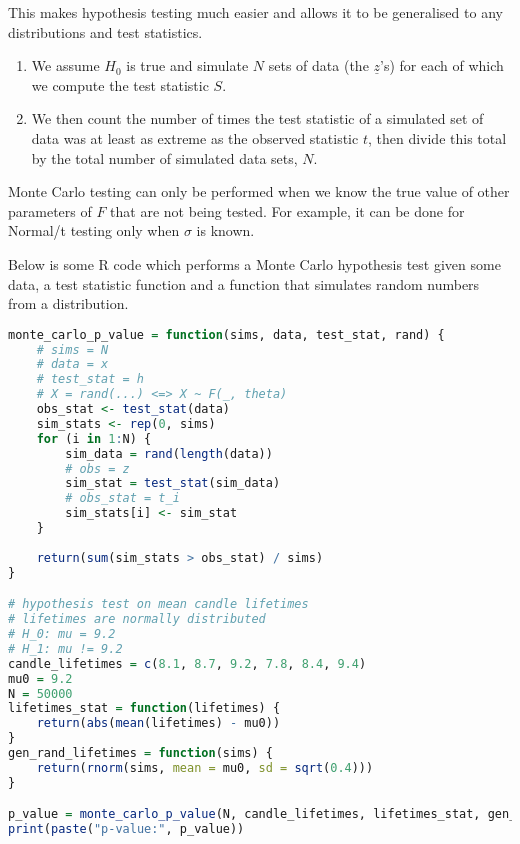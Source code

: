 \begin{remark}
	This makes hypothesis testing much easier and allows it to be generalised to any distributions and test statistics.

	\begin{enumerate}
		\item We assume $H_0$ is true and simulate $N$ sets of data (the $\underline{z}$'s) for each of which we compute the test statistic $S$.
		\item We then count the number of times the test statistic of a simulated set of data was at least as extreme as the observed statistic $t$, then divide this total by the total number of simulated data sets, $N$.
	\end{enumerate}
\end{remark}

\begin{remark}
	Monte Carlo testing can only be performed when we know the true value of other parameters of $F$ that are not being tested. For example, it can be done for Normal/t testing only when $\sigma$ is known.
\end{remark}

\begin{example}
	Below is some R code which performs a Monte Carlo hypothesis test given some data, a test statistic function and a function that simulates random numbers from a distribution.

	\begin{lstlisting}[language=R]
monte_carlo_p_value = function(sims, data, test_stat, rand) {
	# sims = N
	# data = x
	# test_stat = h
	# X = rand(...) <=> X ~ F(_, theta)
	obs_stat <- test_stat(data)
	sim_stats <- rep(0, sims)
	for (i in 1:N) {
		sim_data = rand(length(data))
		# obs = z
		sim_stat = test_stat(sim_data)
		# obs_stat = t_i
		sim_stats[i] <- sim_stat
	}
	
	return(sum(sim_stats > obs_stat) / sims)
}

# hypothesis test on mean candle lifetimes
# lifetimes are normally distributed
# H_0: mu = 9.2
# H_1: mu != 9.2
candle_lifetimes = c(8.1, 8.7, 9.2, 7.8, 8.4, 9.4)
mu0 = 9.2
N = 50000
lifetimes_stat = function(lifetimes) {
	return(abs(mean(lifetimes) - mu0))
}
gen_rand_lifetimes = function(sims) {
	return(rnorm(sims, mean = mu0, sd = sqrt(0.4)))
}

p_value = monte_carlo_p_value(N, candle_lifetimes, lifetimes_stat, gen_rand_lifetimes)
print(paste("p-value:", p_value))
	\end{lstlisting}
\end{example}

